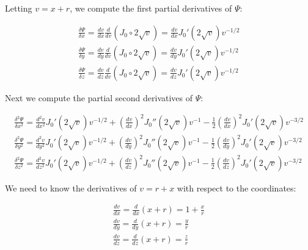 \documentclass{article}
\begin{document}
\vskip 12pt

Letting $v=x+r$, we compute the first partial derivatives of $\Psi$:

\begin{equation}
\begin{gathered}
\frac{\delta \Psi}{\delta x} = \frac{d v}{d x} \frac{d}{d v} \left(J_0 \circ 2\sqrt{v}\right) = \frac{d v}{d x} J_0'(2\sqrt{v}) v^{-1/2} \\
\frac{\delta \Psi}{\delta y} = \frac{d v}{d y} \frac{d}{d v} \left(J_0 \circ 2\sqrt{v}\right) = \frac{d v}{d y} J_0'(2\sqrt{v}) v^{-1/2} \\
\frac{\delta \Psi}{\delta z} = \frac{d v}{d z} \frac{d}{d v} \left(J_0 \circ 2\sqrt{v}\right) = \frac{d v}{d z} J_0'(2\sqrt{v}) v^{-1/2}
\end{gathered}
\end{equation}

\vskip 12pt

Next we compute the partial second derivatives of $\Psi$:

\begin{equation}
\label{second partials}
\begin{gathered}
\frac{\delta^2 \Psi}{\delta x^2} = \frac{d^2 v}{d x^2} J_0'(2\sqrt{v}) v^{-1/2} + \left(\frac{d v}{d x}\right)^2 J_0''(2\sqrt{v}) v^{-1} - \frac{1}{2} \left(\frac{d v}{d x}\right)^2 J_0'(2\sqrt{v}) v^{-3/2} \\
\frac{\delta^2 \Psi}{\delta y^2} = \frac{d^2 v}{d y^2} J_0'(2\sqrt{v}) v^{-1/2} + \left(\frac{d v}{d y}\right)^2 J_0''(2\sqrt{v}) v^{-1} - \frac{1}{2} \left(\frac{d v}{d y}\right)^2 J_0'(2\sqrt{v}) v^{-3/2} \\
\frac{\delta^2 \Psi}{\delta z^2} = \frac{d^2 v}{d z^2} J_0'(2\sqrt{v}) v^{-1/2} + \left(\frac{d v}{d z}\right)^2 J_0''(2\sqrt{v}) v^{-1} - \frac{1}{2} \left(\frac{d v}{d z}\right)^2 J_0'(2\sqrt{v}) v^{-3/2}
\end{gathered}
\end{equation}

\vskip 12pt

We need to know the derivatives of $v=r+x$ with respect to the coordinates:

\vskip 12pt

\begin{equation}
\label{first v}
\begin{gathered}
\frac{d v}{d x} = \frac{d}{d x} (x+r) = 1 + \frac{x}{r} \\
\frac{d v}{d y} = \frac{d}{d y} (x+r) = \frac{y}{r} \\
\frac{d v}{d z} = \frac{d}{d z} (x+r) = \frac{z}{r}
\end{gathered}
\end{equation}
\end{document}
